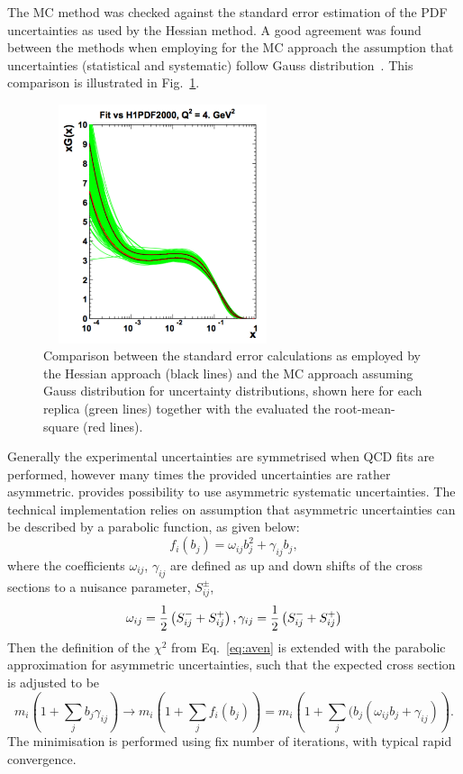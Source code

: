 \begin{description}
The MC method was checked against the standard error estimation of the PDF uncertainties as used by the Hessian method. 
A good agreement was found between the methods when employing for the MC approach the assumption that uncertainties 
(statistical and systematic) follow Gauss distribution~\cite{hera-lhc:report2009}. 
This comparison is illustrated in Fig.~\ref{fig:mchessian}.
\begin{figure}[!ht]
 \centering
  \includegraphics[width=7cm,height=7cm]{mchessian.pdf}
  \caption{Comparison between the standard error calculations as employed by the Hessian approach (black lines) 
      and the MC approach assuming Gauss distribution for uncertainty distributions, shown here for each replica 
          (green lines) together with the evaluated the root-mean-square (red lines).}
  \label{fig:mchessian}        
\end{figure}

Generally the experimental uncertainties are symmetrised when QCD fits 
are performed, however many times the provided uncertainties are rather asymmetric.
\fitter provides possibility to use asymmetric systematic uncertainties.
The technical implementation relies on assumption that 
asymmetric uncertainties can be described by a parabolic function, as given below:
\begin{equation}
  f_i(b_j)=\omega_{ij}b_j^2 + \gamma_{ij}b_j,
\end{equation}
where the coefficients $\omega_{ij}$, $\gamma_{ij}$ are defined as 
up and down shifts of the cross sections to a nuisance parameter, $S_{ij}^{\pm}$, 
{ \small
\begin{equation}
  \omega_{ij}=\frac{1}{2}\left(S_{ij}^{-}+S_{ij}^{+}\right), \\
  \gamma_{ij}=\frac{1}{2}\left(S_{ij}^{-}+S_{ij}^{+}\right) 
\end{equation}
}
Then the definition of the $\chi^2$ from Eq.~\ref{eq:aven} is extended with the parabolic approximation 
for asymmetric uncertainties, such that the expected cross section is adjusted to be
{ \scriptsize
\begin{equation}
  m_i(1+\sum_j b_j\gamma_{ij}) \to m_i\left(1+\sum_{j}f_i(b_j)\right) = m_i\left(1+\sum_j(b_j(\omega_{ij}b_j + \gamma_{ij})\right).
\end{equation}
}
The minimisation is performed using ﬁx number of iterations, with typical rapid convergence.


\end{description}


